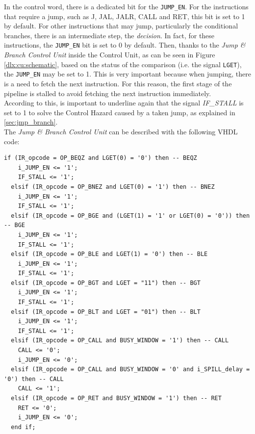 In the control word, there is a dedicated bit for the \texttt{JUMP\_EN}. For the instructions that require a jump, such as J, JAL, JALR, CALL and RET, this bit is set to 1 by default. For other instructions that may jump, particularly the conditional branches, there is an intermediate step, the \emph{decision}. In fact, for these instructions, the \texttt{JUMP\_EN} bit is set to 0 by default. Then, thanks to the \emph{Jump \& Branch Control Unit} inside the Control Unit, as can be seen in Figure \ref{dlx:cu:schematic}, based on the status of the comparison (i.e. the signal \texttt{LGET}), the \texttt{JUMP\_EN} may be set to 1. This is very important because when jumping, there is a need to fetch the next instruction. For this reason, the first stage of the pipeline is stalled to avoid fetching the next instruction immediately.\\ 

According to this, is important to underline again that the signal \emph{IF\_STALL} is set to 1 to solve the Control Hazard caused by a taken jump, as explained in \autoref{sec:jmp_branch}.\\

The \emph{Jump \& Branch Control Unit} can be described with the following VHDL code:\\

\begin{lstlisting}[style=vhdl,caption={VHDL code for the conditional branch},label=conditional_branches_code]
  if (IR_opcode = OP_BEQZ and LGET(0) = '0') then -- BEQZ 
    i_JUMP_EN <= '1';
    IF_STALL <= '1';
  elsif (IR_opcode = OP_BNEZ and LGET(0) = '1') then -- BNEZ
    i_JUMP_EN <= '1';
    IF_STALL <= '1';
  elsif (IR_opcode = OP_BGE and (LGET(1) = '1' or LGET(0) = '0')) then -- BGE
    i_JUMP_EN <= '1';
    IF_STALL <= '1';
  elsif (IR_opcode = OP_BLE and LGET(1) = '0') then -- BLE
    i_JUMP_EN <= '1';
    IF_STALL <= '1';
  elsif (IR_opcode = OP_BGT and LGET = "11") then -- BGT
    i_JUMP_EN <= '1';
    IF_STALL <= '1';
  elsif (IR_opcode = OP_BLT and LGET = "01") then -- BLT
    i_JUMP_EN <= '1';
    IF_STALL <= '1';
  elsif (IR_opcode = OP_CALL and BUSY_WINDOW = '1') then -- CALL
    CALL <= '0';
    i_JUMP_EN <= '0';	
  elsif (IR_opcode = OP_CALL and BUSY_WINDOW = '0' and i_SPILL_delay = '0') then -- CALL
    CALL <= '1';
  elsif (IR_opcode = OP_RET and BUSY_WINDOW = '1') then -- RET
    RET <= '0';
    i_JUMP_EN <= '0';
  end if;
\end{lstlisting}

